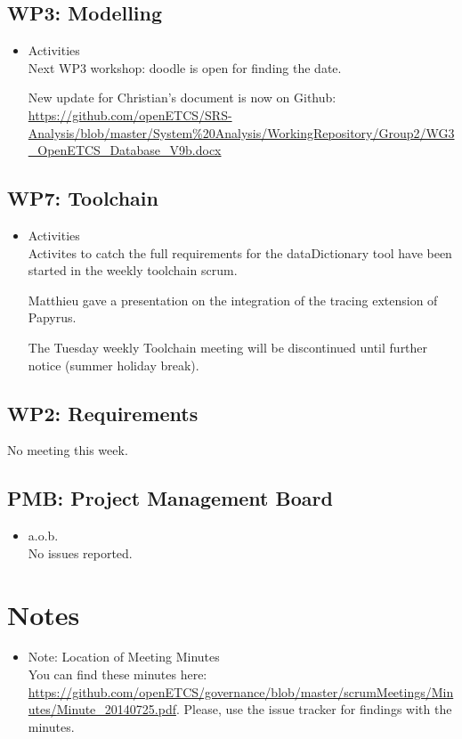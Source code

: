 \documentclass[a4paper, 11pt]{article}
\begin{document}
\subsection{WP3: Modelling}

\begin{itemize}
\item Activities\\
Next WP3 workshop: doodle is open for finding the date. 

New update for Christian's document is now on Github: \url{https://github.com/openETCS/SRS-Analysis/blob/master/System%20Analysis/WorkingRepository/Group2/WG3_OpenETCS_Database_V9b.docx}

\end{itemize}

\subsection{WP7: Toolchain}

\begin{itemize}
\item Activities\\
Activites to catch the full requirements for the dataDictionary tool have been started in the weekly toolchain scrum.

Matthieu gave a presentation on the integration of the tracing extension of Papyrus.

The Tuesday weekly Toolchain meeting will be discontinued until further notice (summer holiday break).

\end{itemize}

\subsection{WP2: Requirements}


No meeting this week.


\subsection{PMB: Project Management Board}
\begin{itemize}
\item a.o.b.\\
No issues reported.

\end{itemize}

\section{Notes}
\begin{itemize}

\item Note: Location of Meeting Minutes\\
You can find these minutes here: \url{https://github.com/openETCS/governance/blob/master/scrumMeetings/Minutes/Minute_20140725.pdf}. Please, use the issue tracker for findings with the minutes.

\end{itemize}
\end{document}
